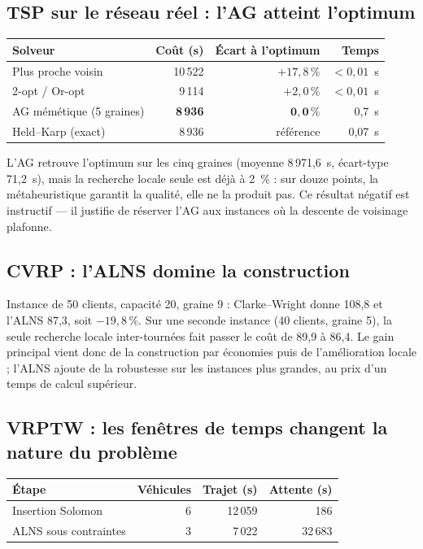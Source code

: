 \documentclass[11pt,a4paper]{article}
\begin{document}
\subsection{TSP sur le réseau réel : l'AG atteint l'optimum}

\begin{center}
\small
\begin{tabular}{@{}lrrr@{}}
\toprule
\textbf{Solveur} & \textbf{Coût (s)} & \textbf{Écart à l'optimum} & \textbf{Temps} \\
\midrule
Plus proche voisin & 10\,522 & $+17{,}8\,\%$ & $<0{,}01$~s \\
2-opt / Or-opt & 9\,114 & $+2{,}0\,\%$ & $<0{,}01$~s \\
AG mémétique (5 graines) & \textbf{8\,936} & $\mathbf{0{,}0\,\%}$ & 0,7~s \\
Held--Karp (exact) & 8\,936 & référence & 0,07~s \\
\bottomrule
\end{tabular}
\end{center}

L'AG retrouve l'optimum sur les cinq graines (moyenne 8\,971,6~s, écart-type 71,2~s), mais la recherche locale seule est déjà à 2~\% : sur douze points, la métaheuristique garantit la qualité, elle ne la produit pas. Ce résultat négatif est instructif — il justifie de réserver l'AG aux instances où la descente de voisinage plafonne.

\subsection{CVRP : l'ALNS domine la construction}

Instance de 50 clients, capacité 20, graine 9 : Clarke--Wright donne 108,8 et l'ALNS 87,3, soit $-19{,}8\,\%$. Sur une seconde instance (40 clients, graine 5), la seule recherche locale inter-tournées fait passer le coût de 89,9 à 86,4. Le gain principal vient donc de la construction par économies puis de l'amélioration locale ; l'ALNS ajoute de la robustesse sur les instances plus grandes, au prix d'un temps de calcul supérieur.

\subsection{VRPTW : les fenêtres de temps changent la nature du problème}

\begin{center}
\small
\begin{tabular}{@{}lrrr@{}}
\toprule
\textbf{Étape} & \textbf{Véhicules} & \textbf{Trajet (s)} & \textbf{Attente (s)} \\
\midrule
Insertion Solomon & 6 & 12\,059 & 186 \\
ALNS sous contraintes & 3 & 7\,022 & 32\,683 \\
\bottomrule
\end{tabular}
\end{center}
\end{document}
